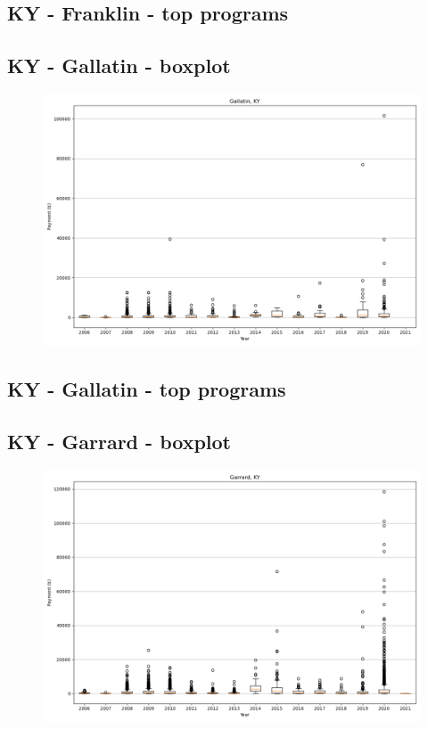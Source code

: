 \subsection*{KY - Franklin - top programs}

\newpage
\subsection*{KY - Gallatin - boxplot}
\begin{figure}[h]
\centering
\includegraphics[width=7in]{../output/boxplots/counties/Gallatin-KY_boxplot.png}
\end{figure}


\subsection*{KY - Gallatin - top programs}

\newpage
\subsection*{KY - Garrard - boxplot}
\begin{figure}[h]
\centering
\includegraphics[width=7in]{../output/boxplots/counties/Garrard-KY_boxplot.png}
\end{figure}


